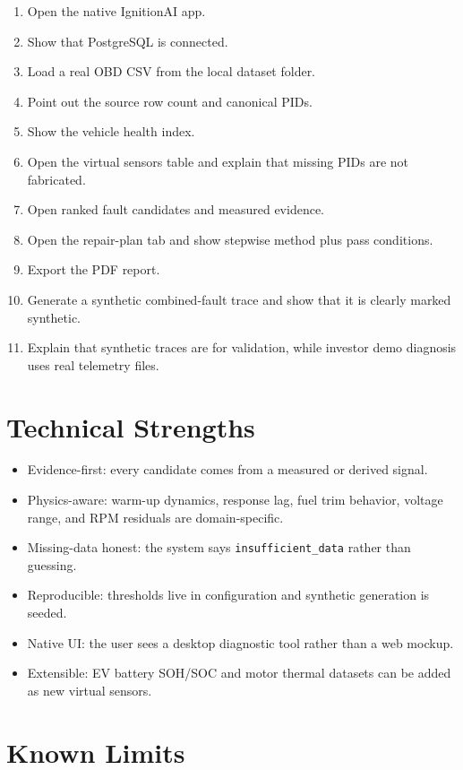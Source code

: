 \documentclass[11pt,a4paper]{article}
\begin{document}
\begin{enumerate}
\item Open the native IgnitionAI app.
\item Show that PostgreSQL is connected.
\item Load a real OBD CSV from the local dataset folder.
\item Point out the source row count and canonical PIDs.
\item Show the vehicle health index.
\item Open the virtual sensors table and explain that missing PIDs are not fabricated.
\item Open ranked fault candidates and measured evidence.
\item Open the repair-plan tab and show stepwise method plus pass conditions.
\item Export the PDF report.
\item Generate a synthetic combined-fault trace and show that it is clearly marked synthetic.
\item Explain that synthetic traces are for validation, while investor demo diagnosis uses real telemetry files.
\end{enumerate}

\section{Technical Strengths}

\begin{itemize}
\item Evidence-first: every candidate comes from a measured or derived signal.
\item Physics-aware: warm-up dynamics, response lag, fuel trim behavior, voltage range, and RPM residuals are domain-specific.
\item Missing-data honest: the system says \texttt{insufficient\_data} rather than guessing.
\item Reproducible: thresholds live in configuration and synthetic generation is seeded.
\item Native UI: the user sees a desktop diagnostic tool rather than a web mockup.
\item Extensible: EV battery SOH/SOC and motor thermal datasets can be added as new virtual sensors.
\end{itemize}

\section{Known Limits}
\end{document}
